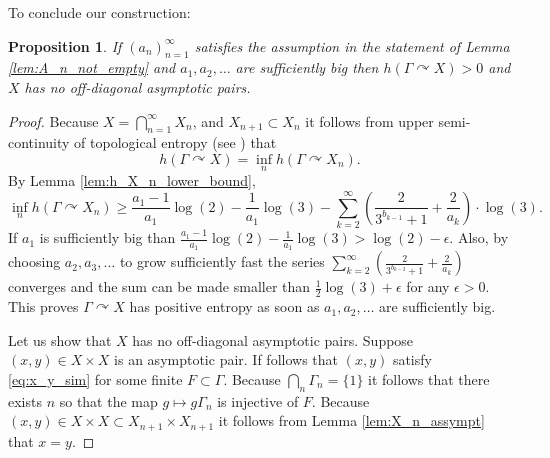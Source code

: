\documentclass[oneside,english]{amsart}
\newtheorem{prop}[thm]{Proposition}
\theoremstyle{definition}
\newcommand{\act}[2]{{#1} \curvearrowright {#2}}
\begin{document}
To conclude our construction:
\begin{prop}
If %
 $(a_n)_{n=1}^\infty$ satisfies the assumption in the statement of Lemma \ref{lem:A_n_not_empty}  and $a_1,a_2,\ldots $ are sufficiently big then
 $h(\act{\Gamma}{X})>0 $  and $X$ has no off-diagonal asymptotic pairs.
\end{prop}
\begin{proof}
Because $X = \bigcap_{n=1}^\infty X_n$, and $X_{n+1} \subset X_n$ it follows from  %
upper semi-continuity of topological entropy (see \cite[Appendix $A$]{ETS:10144219})
that
$$h(\act{\Gamma}{X})= \inf_n  h(\act{\Gamma}{X_n}).$$
By  Lemma \ref{lem:h_X_n_lower_bound},
$$\inf_n h(\act{\Gamma}{X_n}) \ge \frac{a_1-1}{a_1}\log(2)- \frac{1}{a_1}\log(3) - \sum_{k=2}^\infty \left(\frac{2}{3^{b_{k-1}}+1}+\frac{2}{a_k}\right)\cdot \log(3).$$
If $a_1$ is sufficiently big than $ \frac{a_1-1}{a_1}\log(2)- \frac{1}{a_1}\log(3)  > \log(2) -\epsilon$. Also, by choosing $a_2,a_3,\ldots$ to grow sufficiently fast
the series $\sum_{k=2}^\infty \left(\frac{2}{3^{b_{k-2}}+1}+\frac{2}{a_k}\right)$ converges and the sum can be made smaller than $\frac{1}{2}\log(3) + \epsilon$ for any $\epsilon >0$.
This proves $\act{\Gamma}{X}$ has  positive entropy as soon as $a_1,a_2,\ldots $ are sufficiently big.

Let us show that $X$ has no  off-diagonal asymptotic pairs.
Suppose $(x,y) \in X\times X$ is an asymptotic pair.   If follows
that $(x,y)$  satisfy \eqref{eq:x_y_sim} for some finite $F \subset \Gamma$.
Because $\bigcap_n \Gamma_n = \{1\}$ it follows that there exists $n$ so that the map $g \mapsto g\Gamma_n$ is injective of $F$.
 Because $(x,y) \in X \times X \subset X_{n+1} \times X_{n+1}$ it follows from  Lemma \ref{lem:X_n_assympt} that $x=y$.
\end{proof}




\end{document}
